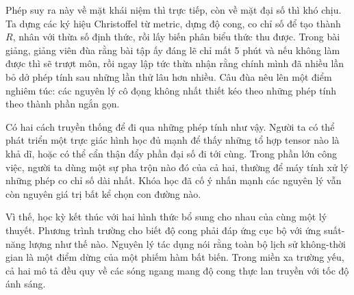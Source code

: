 Phép suy ra này về mặt khái niệm thì trực tiếp, còn về mặt đại số thì khó chịu. Ta dựng các ký hiệu Christoffel từ metric, dựng độ cong, co chỉ số để tạo thành \(R\), nhân với thừa số định thức, rồi lấy biến phân biểu thức thu được. Trong bài giảng, giảng viên đùa rằng bài tập ấy đáng lẽ chỉ mất 5 phút và nếu không làm được thì sẽ trượt môn, rồi ngay lập tức thừa nhận rằng chính mình đã nhiều lần bỏ dở phép tính sau những lần thử lâu hơn nhiều. Câu đùa nêu lên một điểm nghiêm túc: các nguyên lý cô đọng không nhất thiết kéo theo những phép tính theo thành phần ngắn gọn.

\begin{classroomqa}
\end{classroomqa}

Có hai cách truyền thống để đi qua những phép tính như vậy. Người ta có thể phát triển một trực giác hình học đủ mạnh để thấy những tổ hợp tensor nào là khả dĩ, hoặc có thể cẩn thận đẩy phần đại số đi tới cùng. Trong phần lớn công việc, người ta dùng một sự pha trộn nào đó của cả hai, thường để máy tính xử lý những phép co chỉ số dài nhất. Khóa học đã cố ý nhấn mạnh các nguyên lý vẫn còn nguyên giá trị bất kể chọn con đường nào.

\begin{classroomqa}
\end{classroomqa}

Vì thế, học kỳ kết thúc với hai hình thức bổ sung cho nhau của cùng một lý thuyết. Phương trình trường cho biết độ cong phải đáp ứng cục bộ với ứng suất-năng lượng như thế nào. Nguyên lý tác dụng nói rằng toàn bộ lịch sử không-thời gian là một điểm dừng của một phiếm hàm bất biến. Trong miền xa trường yếu, cả hai mô tả đều quy về các sóng ngang mang độ cong thực lan truyền với tốc độ ánh sáng.